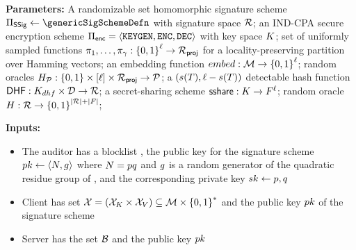 \begin{mdframed}[frametitle={Delegated Fuzzy PSI}, frametitlealignment=\centering, 
	font=\small]
	
	\smallskip\noindent\textbf{Parameters:} A randomizable set homomorphic signature scheme 
	$\sigScheme \assign \genericSigSchemeDefn$ with signature space $\sigOutputSpace$; an 
	IND-CPA secure encryption scheme $\encryptionSchemeDefn$ with key space 
	$K$; set of uniformly sampled functions $\projFn[1], \dots, 
	\projFn[\numProjections]: \setDefn{0,1}^{\genericVecLen} \rightarrow \projRange$ for a 
	locality-preserving partition over Hamming vectors; an embedding function 
	$\embed: \metricSpace \rightarrow \setDefn{0,1}^{\genericVecLen}$; 
	random oracles $\primeRO: 
	\setDefn{0,1} \times \nats[\genericVecLen] \times \projRange \rightarrow \primes$;  
	a $(\scalingFn(\threshold), \genericVecLen - \scalingFn(\threshold))$ detectable hash 
	function $\dhf: \dhfKeySpace \times \dhfDomain \rightarrow \dhfRange$;
	a secret-sharing scheme $\mathsf{sshare}: K \rightarrow 
	F^{\ell}$; random oracle $\ro: 
	\sigOutputSpace \rightarrow \setDefn{0,1}^{\setSize{\dhfRange} + 
		\setSize{\secretShareOutputSpace}}$;
	
	\smallskip\noindent\textbf{Inputs:}
	\begin{itemize}[leftmargin=0.5em]
		\item The auditor \auditor has a blocklist \blocklist, the public key for the signature scheme 
		$\pubKey \assign \tupleDefn{\rsaMod, \qrGen}$ where $\rsaMod = \safePrime[1] \safePrime[2]$ 
		and $g$ is a random generator of the quadratic residue group \qrGroup of 
		\integersModNInv , and the corresponding private key $\privKey \assign \safePrime[1], 
		\safePrime[2]$  
		\item 	Client has set $\cInputSet = (\keySetLabel \times \valSetLabel) \subseteq \metricSpace 
		\times \setDefn{0,1}^{\ast}$ and the public key $\pubKey$ of the signature scheme
		\item Server has the set $\blocklist$ and the public key $\pubKey$ 	
	\end{itemize}
	

\end{mdframed}
